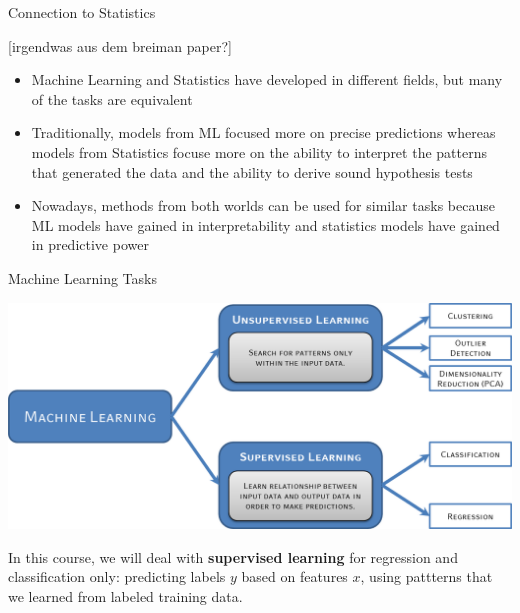 \documentclass[11pt,compress,t,notes=noshow, xcolor=table]{beamer}
\begin{document}

\begin{frame}{Connection to Statistics}

[irgendwas aus dem breiman paper?]

\begin{itemize}
	\item Machine Learning and Statistics have developed in different fields, but many of the tasks are equivalent
	\item Traditionally, models from ML focused more on precise predictions whereas models from Statistics focuse more on the ability to interpret the patterns that generated the data and the ability to derive sound hypothesis tests
	\item Nowadays, methods from both worlds can be used for similar tasks because ML models have gained in interpretability and statistics models have gained in predictive power
\end{itemize}

\end{frame}


\begin{frame}{Machine Learning Tasks}

\begin{center}
  \includegraphics[height=0.5\textheight]{figure_man/ml-types.png}
\end{center}

In this course, we will deal with \textbf{supervised learning} for regression 
and classification only: predicting labels $y$ based on features $x$, using 
pattterns that we learned from labeled training data.

\end{frame}
\end{document}
